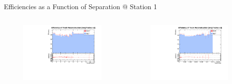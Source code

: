 
\begin{frame}{Efficiencies as a Function of Separation @ Station 1}
    \begin{columns}
        \begin{column}{0.6\linewidth}
            \begin{figure}
                \includegraphics[width=1\linewidth]{./output/Effi_greq2_DeltaR0_unzoom.pdf}
            \end{figure}
        \end{column}
        \begin{column}{0.6\linewidth}
            \begin{figure}
                \includegraphics[width=1\linewidth]{./output/Effi_greq2_Theta0.pdf}

\end{figure}
\end{column}
\end{columns}
\end{frame}
